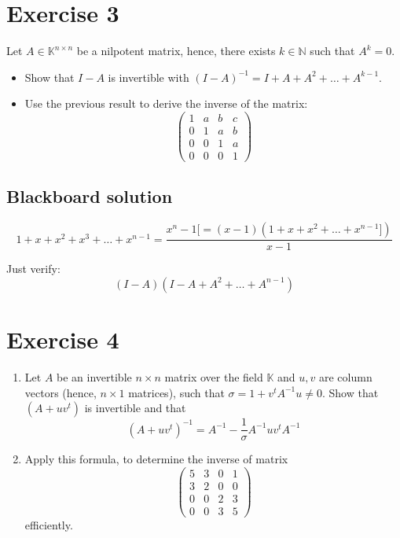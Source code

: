 \documentclass[a4paper]{article}
\theoremstyle{definition}
\begin{document}
\section{Exercise 3}
\begin{ex}
  Let $A \in \mathbb K^{n\times n}$ be a nilpotent matrix, hence, there exists $k \in \mathbb N$ such that $A^k = 0$.
  \begin{itemize}
    \item Show that $I - A$ is invertible with $(I - A)^{-1} = I + A + A^2 + \dots + A^{k-1}$.
    \item Use the previous result to derive the inverse of the matrix:
      \[
        \begin{pmatrix}
          1 & a & b & c \\
          0 & 1 & a & b \\
          0 & 0 & 1 & a \\
          0 & 0 & 0 & 1
        \end{pmatrix}
      \]
  \end{itemize}
\end{ex}

\subsection{Blackboard solution}

\[ 1 + x + x^2 + x^3 + \dots + x^{n-1} = \frac{x^n - 1 [= (x-1)(1 + x + x^2 + \dots + x^{n-1}])}{x-1} \]

Just verify:
\[ (I - A)(I - A + A^2 + \dots + A^{n-1}) \]

\section{Exercise 4}
\begin{ex}
  \begin{enumerate}
    \item Let $A$ be an invertible $n \times n$ matrix over the field $\mathbb K$ and $u,v$ are column vectors (hence, $n\times 1$ matrices),
          such that $\sigma = 1 + v^t A^{-1} u \neq 0$. Show that $(A + uv^t)$ is invertible and that
          \[ (A + uv^t)^{-1} = A^{-1} - \frac1\sigma A^{-1} uv^t A^{-1} \]
    \item Apply this formula, to determine the inverse of matrix
          \[
            \begin{pmatrix}
              5 & 3 & 0 & 1 \\
              3 & 2 & 0 & 0 \\
              0 & 0 & 2 & 3 \\
              0 & 0 & 3 & 5
            \end{pmatrix}
          \]
          efficiently.
  \end{enumerate}
\end{ex}
\end{document}
